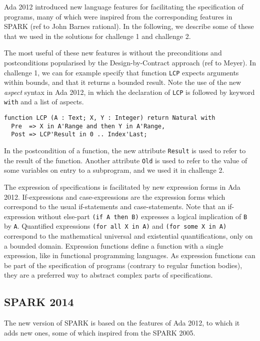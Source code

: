 \documentclass[sttt,draft]{svjour}
\begin{document}
Ada 2012 introduced new language features for facilitating the specification of
programs, many of which were inspired from the corresponding features in SPARK
(ref to John Barnes rational). In the following, we describe some of these that
we used in the solutions for challenge 1 and challenge 2.

The most useful of these new features is without the preconditions and
postconditions popularised by the Design-by-Contract approach (ref to
Meyer). In challenge 1, we can for example specify that function \verb|LCP|
expects arguments within bounds, and that it returns a bounded result. Note the
use of the new \textit{aspect} syntax in Ada 2012, in which the declaration of
\verb|LCP| is followed by keyword \verb|with| and a list of aspects.

\begin{footnotesize}
\begin{verbatim}
function LCP (A : Text; X, Y : Integer) return Natural with
  Pre  => X in A'Range and then Y in A'Range,
  Post => LCP'Result in 0 .. Index'Last;
\end{verbatim}
\end{footnotesize}

In the postcondition of a function, the new attribute \verb|Result| is used to
refer to the result of the function. Another attribute \verb|Old| is used to
refer to the value of some variables on entry to a subprogram, and we used it
in challenge 2.

The expression of specifications is facilitated by new expression forms in Ada
2012. If-expressions and case-expressions are the expression forms which
correspond to the usual if-statements and case-statements. Note that an
if-expression without else-part \verb|(if A then B)| expresses a logical
implication of \verb|B| by \verb|A|. Quantified expressions
\verb|(for all X in A)| and \verb|(for some X in A)| correspond to the
mathematical universal and existential quantifications, only on a bounded
domain. Expression functions define a function with a single expression, like
in functional programming languages. As expression functions can be part of the
specification of programs (contrary to regular function bodies), they are a
preferred way to abstract complex parts of specifications.

\subsection{SPARK 2014}

The new version of SPARK is based on the features of Ada 2012, to which it adds
new ones, some of which inspired from the SPARK 2005.
\end{document}
